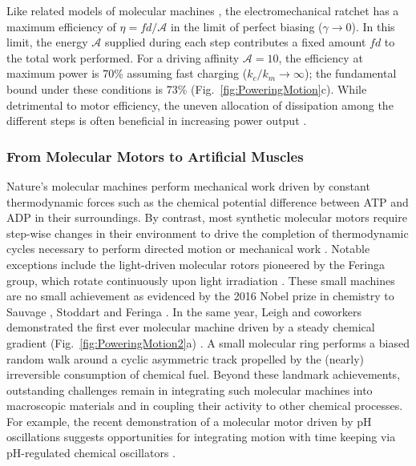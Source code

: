 \begin{appendices}
Like related models of molecular machines \autocite{Pietzonka2016}, the electromechanical ratchet has a maximum efficiency of $\eta=f d/\mathcal{A}$ in the limit of perfect biasing ($\gamma\rightarrow 0$).  In this limit, the energy $\mathcal{A}$ supplied during each step contributes a fixed amount $f d$ to the total work performed.  For a driving affinity $\mathcal{A}=10$, the efficiency at maximum power is 70\% assuming fast charging ($k_c/k_m\rightarrow\infty$); the fundamental bound under these conditions is 73\% (Fig.~\ref{fig:PoweringMotion}c).  While detrimental to motor efficiency, the uneven allocation of dissipation among the different steps is often beneficial in increasing power output \autocite{brown2017allocating}. 

\subsubsection{From Molecular Motors to Artificial Muscles}

Nature's molecular machines perform mechanical work driven by constant thermodynamic forces such as the chemical potential difference between ATP and ADP in their surroundings.  By contrast, most synthetic molecular motors require step-wise changes in their environment to drive the completion of thermodynamic cycles necessary to perform directed motion or mechanical work \autocite{coskun2012great, Erbas-Cakmak2015, kassem2017artificial, pezzato2017mastering}.  Notable exceptions include the light-driven molecular rotors pioneered by the Feringa group, which rotate continuously upon light irradiation \autocite{koumura1999light}.  These small machines are no small achievement as evidenced by the 2016 Nobel prize in chemistry to Sauvage \autocite{sauvage2017chemical}, Stoddart \autocite{Stoddart2017} and Feringa \autocite{Feringa2017}. In the same year, Leigh and coworkers demonstrated the first ever molecular machine driven by a steady chemical gradient  (Fig.~\ref{fig:PoweringMotion2}a) \autocite{Wilson2016}. A small molecular ring performs a biased random walk around a cyclic asymmetric track propelled by the (nearly) irreversible consumption of chemical fuel. Beyond these landmark achievements, outstanding challenges remain in integrating such molecular machines into macroscopic materials and in coupling their activity to other chemical processes.  For example, the recent demonstration of a molecular motor driven by pH oscillations \autocite{Erbas-Cakmak2017} suggests opportunities for integrating motion with time keeping via pH-regulated chemical oscillators \autocite{orbán2015ph}.


\end{appendices}
